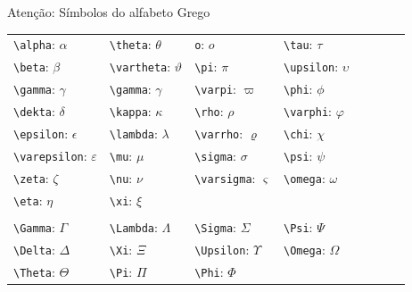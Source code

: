 \documentclass{beamer}
\begin{document}
\begin{frame}[fragile]{Atenção: Símbolos do alfabeto Grego}
	\begin{tabular}{*8l}
		{\verb+\alpha+}: $\alpha$        & {\verb+\theta+}: $\theta$       & {\verb+o+}: $o$            & {\verb+\tau+}: $\tau$         \\
		{\verb+\beta+}: $\beta$         & {\verb+\vartheta+}: $\vartheta$    & {\verb+\pi+}: $\pi$          & {\verb+\upsilon+}: $\upsilon$     \\
		{\verb+\gamma+}: $\gamma$        & {\verb+\gamma+}: $\gamma$       & {\verb+\varpi+}: $\varpi$       & {\verb+\phi+}: $\phi$    \\
		{\verb+\dekta+}: $\delta$        & {\verb+\kappa+}: $\kappa$       & {\verb+\rho+}: $\rho$         & {\verb+\varphi+}: $\varphi$      \\
		{\verb+\epsilon+}: $\epsilon$      & {\verb+\lambda+}: $\lambda$      & {\verb+\varrho+}: $\varrho$      & {\verb+\chi+}: $\chi$         \\
		{\verb+\varepsilon+}: $\varepsilon$   & {\verb+\mu+}: $\mu$          & {\verb+\sigma+}: $\sigma$       & {\verb+\psi+}: $\psi$         \\
		{\verb+\zeta+}: $\zeta$         & {\verb+\nu+}: $\nu$          & {\verb+\varsigma+}: $\varsigma$    & {\verb+\omega+}: $\omega$       \\
		{\verb+\eta+}: $\eta$          & {\verb+\xi+}: $\xi$                                          \\
		                                                                \\
		{\verb+\Gamma+}: $\Gamma$        & {\verb+\Lambda+}: $\Lambda$      & {\verb+\Sigma+}: $\Sigma$       & {\verb+\Psi+}: $\Psi$         \\
		{\verb+\Delta+}: $\Delta$        & {\verb+\Xi+}: $\Xi$          & {\verb+\Upsilon+}: $\Upsilon$     & {\verb+\Omega+}: $\Omega$       \\
		{\verb+\Theta+}: $\Theta$        & {\verb+\Pi+}: $\Pi$          & {\verb+\Phi+}: $\Phi$
	\end{tabular}
\end{frame}
\end{document}
